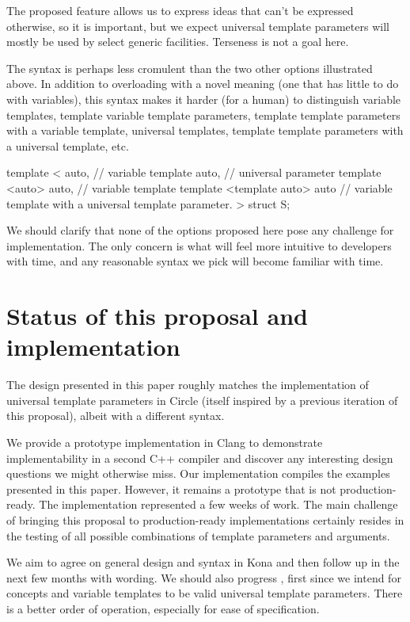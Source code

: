 \documentclass{wg21}
\begin{document}
The proposed feature allows us to express ideas that can't be expressed otherwise, so it is important,
but we expect universal template parameters will mostly be used by select generic facilities. Terseness is not a goal here.

The  syntax is perhaps less cromulent than the two other options illustrated above. In addition to overloading
 with a novel meaning (one that has little to do with variables), this syntax makes it harder (for a human) to distinguish
variable templates, template variable template parameters, template template parameters with a variable template, universal templates,
template template parameters with a universal template, etc.

\begin{colorblock}
template <
   auto, // variable
   template auto, // universal parameter
   template <auto> auto, // variable template
   template <template auto> auto // variable template with a universal template parameter.
>
struct S;
\end{colorblock}


We should clarify that none of the options proposed here pose any challenge for implementation. The only concern is what will feel more intuitive to
developers with time, and any reasonable syntax we pick will become familiar with time.


\section{Status of this proposal and implementation}

The design presented in this paper roughly matches the implementation of universal template parameters in Circle (itself inspired by a previous iteration of this proposal),
albeit with a different syntax.

We provide a prototype implementation in Clang to demonstrate implementability in a second C++ compiler and discover any interesting design questions we might otherwise
miss. Our implementation compiles the examples presented in this paper. However, it remains a prototype that is not production-ready.
The implementation represented a few weeks of work. The main challenge of bringing this proposal to production-ready implementations certainly resides in the
testing of all possible combinations of template parameters and arguments.


We aim to agree on general design and syntax in Kona and then follow up in the next few months with wording.
We should also progress , first since we intend for concepts and variable templates to be valid universal template parameters.
There is a better order of operation, especially for ease of specification.
\end{document}
